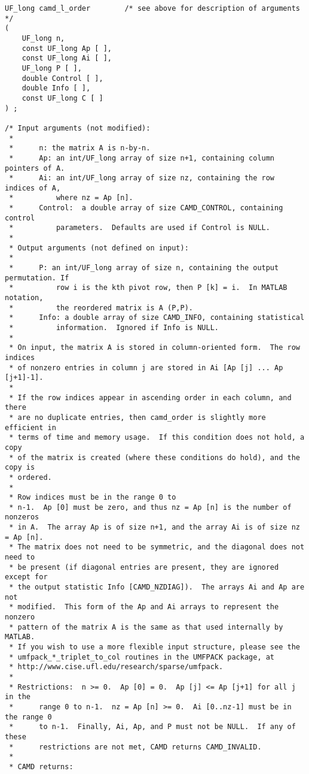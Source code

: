 \documentclass[11pt]{article}
\begin{document}
{\begin{verbatim}
UF_long camd_l_order        /* see above for description of arguments */
(
    UF_long n,
    const UF_long Ap [ ],
    const UF_long Ai [ ],
    UF_long P [ ],
    double Control [ ],
    double Info [ ],
    const UF_long C [ ]
) ;

/* Input arguments (not modified):
 *
 *      n: the matrix A is n-by-n.
 *      Ap: an int/UF_long array of size n+1, containing column pointers of A.
 *      Ai: an int/UF_long array of size nz, containing the row indices of A,
 *          where nz = Ap [n].
 *      Control:  a double array of size CAMD_CONTROL, containing control
 *          parameters.  Defaults are used if Control is NULL.
 *
 * Output arguments (not defined on input):
 *
 *      P: an int/UF_long array of size n, containing the output permutation. If
 *          row i is the kth pivot row, then P [k] = i.  In MATLAB notation,
 *          the reordered matrix is A (P,P).
 *      Info: a double array of size CAMD_INFO, containing statistical
 *          information.  Ignored if Info is NULL.
 *
 * On input, the matrix A is stored in column-oriented form.  The row indices
 * of nonzero entries in column j are stored in Ai [Ap [j] ... Ap [j+1]-1].
 *
 * If the row indices appear in ascending order in each column, and there
 * are no duplicate entries, then camd_order is slightly more efficient in
 * terms of time and memory usage.  If this condition does not hold, a copy
 * of the matrix is created (where these conditions do hold), and the copy is
 * ordered.
 *
 * Row indices must be in the range 0 to
 * n-1.  Ap [0] must be zero, and thus nz = Ap [n] is the number of nonzeros
 * in A.  The array Ap is of size n+1, and the array Ai is of size nz = Ap [n].
 * The matrix does not need to be symmetric, and the diagonal does not need to
 * be present (if diagonal entries are present, they are ignored except for
 * the output statistic Info [CAMD_NZDIAG]).  The arrays Ai and Ap are not
 * modified.  This form of the Ap and Ai arrays to represent the nonzero
 * pattern of the matrix A is the same as that used internally by MATLAB.
 * If you wish to use a more flexible input structure, please see the
 * umfpack_*_triplet_to_col routines in the UMFPACK package, at
 * http://www.cise.ufl.edu/research/sparse/umfpack.
 *
 * Restrictions:  n >= 0.  Ap [0] = 0.  Ap [j] <= Ap [j+1] for all j in the
 *      range 0 to n-1.  nz = Ap [n] >= 0.  Ai [0..nz-1] must be in the range 0
 *      to n-1.  Finally, Ai, Ap, and P must not be NULL.  If any of these
 *      restrictions are not met, CAMD returns CAMD_INVALID.
 *
 * CAMD returns:

\end{verbatim}}
\end{document}

